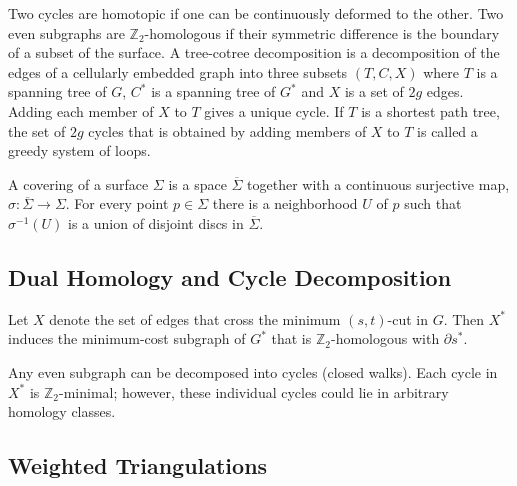 \documentclass[natbib]{svcyclop}
\def\Z{\mathbb{Z}}
\begin{document}
Two cycles are homotopic if one can be continuously deformed to the other.  
Two even subgraphs are $\mathbb{Z}_2$-homologous if their symmetric difference is the boundary of a subset of the surface.
A tree-cotree decomposition is a decomposition of the edges of a cellularly embedded graph into three subsets $(T, C, X)$ where $T$ is a spanning tree of $G$, $C^*$ is a spanning tree of $G^*$ and $X$ is a set of $2g$ edges.  
Adding each member of $X$ to $T$ gives a unique cycle.  
If $T$ is a shortest path tree, the set of $2g$ cycles that is obtained by adding members of $X$ to $T$ is called a greedy system of loops.

A covering of a surface $\Sigma$ is a space $\overline{\Sigma}$ together with a continuous surjective map, $\sigma: \overline{\Sigma} \rightarrow \Sigma$. For every point $p \in \Sigma$ there is a neighborhood $U$ of $p$ such that $\sigma^{-1}(U)$ is a union of disjoint discs in $\overline{\Sigma}$.


\subsection{Dual Homology and Cycle Decomposition}

Let $X$ denote the set of edges that cross the minimum $(s,t)$-cut in $G$.  Then $X^*$ induces the minimum-cost subgraph of $G^*$ that is $\Z_2$-homologous with $\partial s^*$.

Any even subgraph can be decomposed into cycles (closed walks).  Each cycle in $X^*$ is $\Z_2$-minimal; however, these individual cycles could lie in arbitrary homology classes.


\subsection{Weighted Triangulations}
\end{document}
